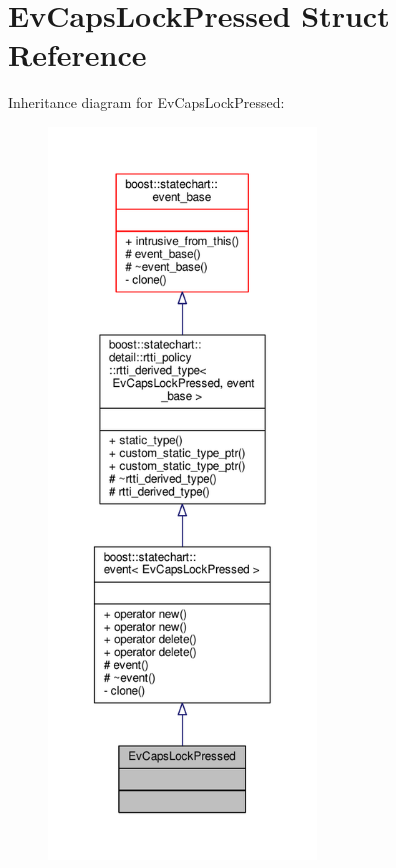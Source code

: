 \hypertarget{struct_ev_caps_lock_pressed}{}\section{Ev\+Caps\+Lock\+Pressed Struct Reference}
\label{struct_ev_caps_lock_pressed}


Inheritance diagram for Ev\+Caps\+Lock\+Pressed\+:
\nopagebreak
\begin{figure}[H]
\begin{center}
\leavevmode
\includegraphics[height=550pt]{struct_ev_caps_lock_pressed__inherit__graph}
\end{center}
\end{figure}


